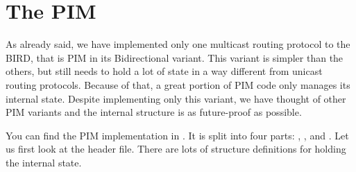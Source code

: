 \section{The PIM}

As already said, we have implemented only one multicast routing protocol to the
BIRD, that is PIM in its Bidirectional variant. This variant is simpler than
the others, but still needs to hold a lot of state in a way different from
unicast routing protocols. Because of that, a great portion of PIM code only
manages its internal state. Despite implementing only this variant, we have
thought of other PIM variants and the internal structure is as
future-proof as possible.

You can find the PIM implementation in . It is split into four
parts: , ,  and . Let us first
look at the header file. There are lots of structure definitions for holding
the internal state.

